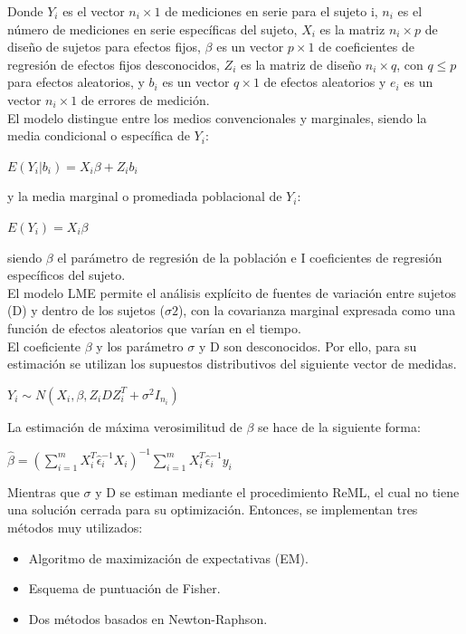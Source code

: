 	Donde $Y_{i}$ es el vector $n_{i}\times1$ de mediciones en serie para el sujeto i, $n_{i}$ es el número de mediciones en serie específicas del sujeto, $X_{i}$ es la matriz $n_{i}\times p$ de diseño de sujetos para efectos fijos, $\beta$ es un vector $p\times 1$ de coeficientes de regresión de efectos fijos desconocidos, $Z_{i}$ es la matriz de diseño $n_{i}\times q$, con $q\leq p$ para efectos aleatorios, y $b_{i}$ es un vector $q\times 1$ de efectos aleatorios y $e_{i}$ es un vector $n_{i}\times 1$ de errores de medición.\\
	
	El modelo distingue entre los medios convencionales y marginales, siendo la media condicional o específica de $Y_{i}$:\\
	\begin{center}
		$ E(Y_{i}|b_{i}) = X_{i}\beta + Z_{i}b_{i}$
	\end{center}y la media marginal o promediada poblacional de $Y_{i}$:\\
	\begin{center}
		$E(Y_{i}) = X_{i} \beta$
	\end{center}
	siendo $\beta$ el parámetro de regresión de la población e I coeficientes de regresión específicos del sujeto.\\
	
	
	El modelo LME permite el análisis explícito de fuentes de variación entre sujetos (D) y dentro de los sujetos ($\sigma 2$), con la covarianza marginal expresada como una función de efectos aleatorios que varían en el tiempo.\\
	
	El coeficiente $\beta$ y los parámetro $\sigma $ y D son desconocidos. Por ello, para su estimación se utilizan los supuestos distributivos del siguiente vector de medidas. 
	\begin{center}
		$Y_{i}\sim N(X_{i},\beta,Z_{i}DZ_{i}^{T} + \sigma ^{2} I_{n_{i}})$
	\end{center}
	La estimación de máxima verosimilitud de $\beta$ se hace de la siguiente forma:
	
	\begin{center}
		$\hat{\beta}=(\sum_{i=1}^{m}X_{i}^{T} \hat{\epsilon}_{i}^{-1}X_{i})^{-1} \sum_{i=1}^{m} X_{i}^{T} \hat{\epsilon}_{i}^{-1}y_{i}$
	\end{center}
	
	Mientras que $\sigma $ y D se estiman mediante el procedimiento ReML, el cual no tiene una solución cerrada para su optimización. Entonces, se implementan tres métodos muy utilizados: 
	\begin{itemize}
		\item Algoritmo de maximización de expectativas (EM).
		\item Esquema de puntuación de Fisher.
		\item Dos métodos basados en Newton-Raphson.
		
	\end{itemize}
	
